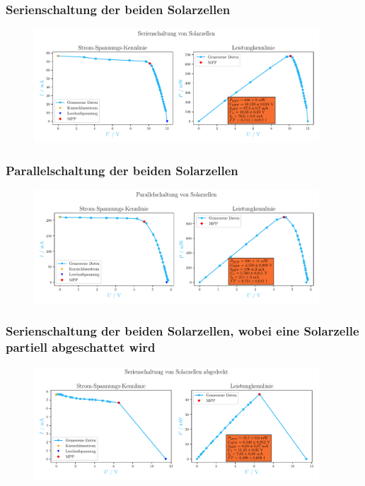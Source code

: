 \documentclass[12pt,english,ngerman]{scrartcl}
\begin{document}

\subsubsection{Serienschaltung der beiden Solarzellen}
\begin{figure}[H]
	\centering
	\includegraphics[width=0.95\textwidth]{figures/serienschaltung.pdf}
	\caption{}\label{fig:auws_kennlinie_serie}
\end{figure}

\subsubsection{Parallelschaltung der beiden Solarzellen}
\begin{figure}[H]
	\centering
	\includegraphics[width=0.95\textwidth]{figures/parallelschaltung.pdf}
	\caption{}\label{fig:auws_kennlinie_parallel}
\end{figure}

\subsubsection{Serienschaltung der beiden Solarzellen, wobei eine Solarzelle partiell abgeschattet wird}

\begin{figure}[H]
	\centering
	\includegraphics[width=0.95\textwidth]{figures/serienschaltungAbgedeckt.pdf}
	\caption{}\label{fig:auws_kennlinie_abgedeckt}
\end{figure}
\end{document}

